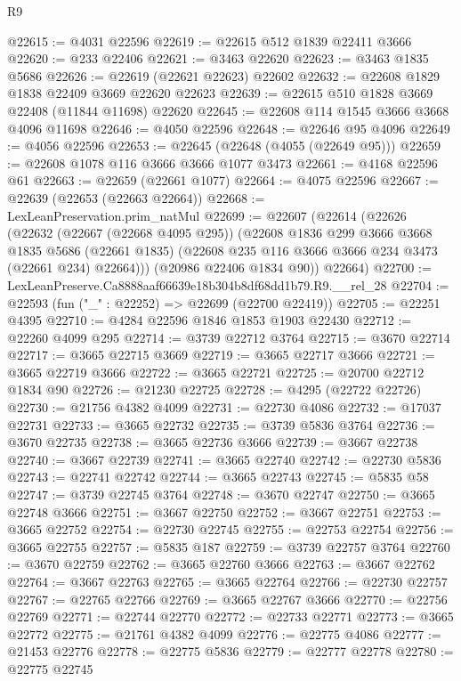\begin{lexlean}{R9}
\begin{coremodule}
@22615 := @4031 @22596
@22619 := @22615 @512 @1839 @22411 @3666
@22620 := @233 @22406
@22621 := @3463 @22620
@22623 := @3463 @1835 @5686
@22626 := @22619 (@22621 @22623) @22602
@22632 := @22608 @1829 @1838 @22409 @3669 @22620 @22623
@22639 := @22615 @510 @1828 @3669 @22408 (@11844 @11698) @22620
@22645 := @22608 @114 @1545 @3666 @3668 @4096 @11698
@22646 := @4050 @22596
@22648 := @22646 @95 @4096
@22649 := @4056 @22596
@22653 := @22645 (@22648 (@4055 (@22649 @95)))
@22659 := @22608 @1078 @116 @3666 @3666 @1077 @3473
@22661 := @4168 @22596 @61
@22663 := @22659 (@22661 @1077)
@22664 := @4075 @22596
@22667 := @22639 (@22653 (@22663 @22664))
@22668 := LexLeanPreservation.prim_natMul
@22699 := @22607
    (@22614
      (@22626
        (@22632
          (@22667 (@22668 @4095 @295))
          (@22608
            @1836
            @299
            @3666
            @3668
            @1835
            @5686
            (@22661 @1835)
            (@22608 @235 @116 @3666 @3666 @234 @3473 (@22661 @234) @22664)))
        (@20986 @22406 @1834 @90))
      @22664)
@22700 := LexLeanPreserve.Ca8888aaf66639e18b304b8df68dd1b79.R9.__rel_28
@22704 := @22593 (fun ("_" : @22252) => @22699 (@22700 @22419))
@22705 := @22251 @4395
@22710 := @4284 @22596 @1846 @1853 @1903 @22430
@22712 := @22260 @4099 @295
@22714 := @3739 @22712 @3764
@22715 := @3670 @22714
@22717 := @3665 @22715 @3669
@22719 := @3665 @22717 @3666
@22721 := @3665 @22719 @3666
@22722 := @3665 @22721
@22725 := @20700 @22712 @1834 @90
@22726 := @21230 @22725
@22728 := @4295 (@22722 @22726)
@22730 := @21756 @4382 @4099
@22731 := @22730 @4086
@22732 := @17037 @22731
@22733 := @3665 @22732
@22735 := @3739 @5836 @3764
@22736 := @3670 @22735
@22738 := @3665 @22736 @3666
@22739 := @3667 @22738
@22740 := @3667 @22739
@22741 := @3665 @22740
@22742 := @22730 @5836
@22743 := @22741 @22742
@22744 := @3665 @22743
@22745 := @5835 @58
@22747 := @3739 @22745 @3764
@22748 := @3670 @22747
@22750 := @3665 @22748 @3666
@22751 := @3667 @22750
@22752 := @3667 @22751
@22753 := @3665 @22752
@22754 := @22730 @22745
@22755 := @22753 @22754
@22756 := @3665 @22755
@22757 := @5835 @187
@22759 := @3739 @22757 @3764
@22760 := @3670 @22759
@22762 := @3665 @22760 @3666
@22763 := @3667 @22762
@22764 := @3667 @22763
@22765 := @3665 @22764
@22766 := @22730 @22757
@22767 := @22765 @22766
@22769 := @3665 @22767 @3666
@22770 := @22756 @22769
@22771 := @22744 @22770
@22772 := @22733 @22771
@22773 := @3665 @22772
@22775 := @21761 @4382 @4099
@22776 := @22775 @4086
@22777 := @21453 @22776
@22778 := @22775 @5836
@22779 := @22777 @22778
@22780 := @22775 @22745

\end{coremodule}
\end{lexlean}

